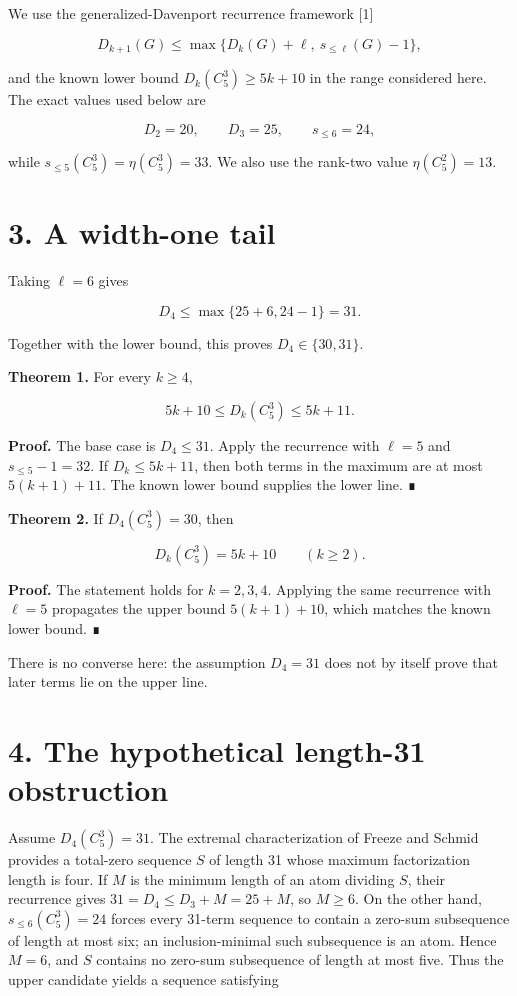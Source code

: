 \documentclass[
  11pt,
]{article}
\begin{document}
We use the generalized-Davenport recurrence framework {[}1{]}

\[
D_{k+1}(G)
\le\max\{D_k(G)+\ell, \ s_{\le\ell}(G)-1\},
\]

and the known lower bound \(D_k(C_5^3)\ge5k+10\) in the range considered
here. The exact values used below are

\[
D_2=20, \qquad D_3=25, \qquad s_{\le6}=24,
\]

while \(s_{\le5}(C_5^3)=\eta(C_5^3)=33\). We also use the rank-two value
\(\eta(C_5^2)=13\).

\hypertarget{a-width-one-tail}{%
\section{3. A width-one tail}\label{a-width-one-tail}}

Taking \(\ell=6\) gives

\[
D_4\le\max\{25+6,24-1\}=31.
\]

Together with the lower bound, this proves \(D_4\in\{30,31\}\).

\textbf{Theorem 1.} For every \(k\ge4\),

\[
5k+10\le D_k(C_5^3)\le5k+11.
\]

\textbf{Proof.} The base case is \(D_4\le31\). Apply the recurrence with
\(\ell=5\) and \(s_{\le5}-1=32\). If \(D_k\le5k+11\), then both terms in
the maximum are at most \(5(k+1)+11\). The known lower bound supplies
the lower line. ∎

\textbf{Theorem 2.} If \(D_4(C_5^3)=30\), then

\[
D_k(C_5^3)=5k+10
\qquad(k\ge2).
\]

\textbf{Proof.} The statement holds for \(k=2,3,4\). Applying the same
recurrence with \(\ell=5\) propagates the upper bound \(5(k+1)+10\),
which matches the known lower bound. ∎

There is no converse here: the assumption \(D_4=31\) does not by itself
prove that later terms lie on the upper line.

\hypertarget{the-hypothetical-length-31-obstruction}{%
\section{4. The hypothetical length-31
obstruction}\label{the-hypothetical-length-31-obstruction}}

Assume \(D_4(C_5^3)=31\). The extremal characterization of Freeze and
Schmid provides a total-zero sequence \(S\) of length 31 whose maximum
factorization length is four. If \(M\) is the minimum length of an atom
dividing \(S\), their recurrence gives \(31=D_4\le D_3+M=25+M\), so
\(M\ge6\). On the other hand, \(s_{\le6}(C_5^3)=24\) forces every
31-term sequence to contain a zero-sum subsequence of length at most
six; an inclusion-minimal such subsequence is an atom. Hence \(M=6\),
and \(S\) contains no zero-sum subsequence of length at most five. Thus
the upper candidate yields a sequence satisfying
\end{document}
